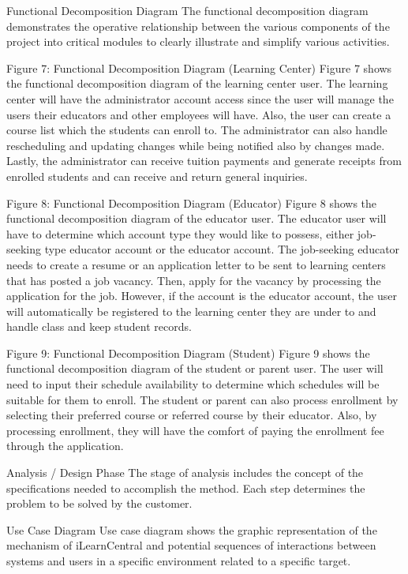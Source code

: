 Functional Decomposition Diagram
The functional decomposition diagram demonstrates the operative relationship between the various components of the project into critical modules to clearly illustrate and simplify various activities.
 
Figure 7: Functional Decomposition Diagram (Learning Center)
Figure 7 shows the functional decomposition diagram of the learning center user. The learning center will have the administrator account access since the user will manage the users their educators and other employees will have. Also, the user can create a course list which the students can enroll to. The administrator can also handle rescheduling and updating changes while being notified also by changes made. Lastly, the administrator can receive tuition payments and generate receipts from enrolled students and can receive and return general inquiries. 
    
Figure 8: Functional Decomposition Diagram (Educator)
Figure 8 shows the functional decomposition diagram of the educator user. The educator user will have to determine which account type they would like to possess, either job-seeking type educator account or the educator account. The job-seeking educator needs to create a resume or an application letter to be sent to learning centers that has posted a job vacancy. Then, apply for the vacancy by processing the application for the job. However, if the account is the educator account, the user will automatically be registered to the learning center they are under to and handle class and keep student records. 
 
Figure 9: Functional Decomposition Diagram (Student)
Figure 9 shows the functional decomposition diagram of the student or parent user. The user will need to input their schedule availability to determine which schedules will be suitable for them to enroll. The student or parent can also process enrollment by selecting their preferred course or referred course by their educator. Also, by processing enrollment, they will have the comfort of paying the enrollment fee through the application.  

Analysis / Design Phase
The stage of analysis includes the concept of the specifications needed to accomplish the method. Each step determines the problem to be solved by the customer.






Use Case Diagram
Use case diagram shows the graphic representation of the mechanism of iLearnCentral and potential sequences of interactions between systems and users in a specific environment related to a specific target.
 
